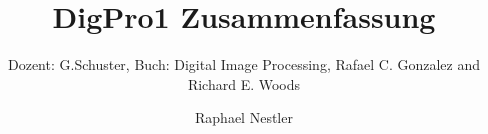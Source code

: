 \documentclass{scrartcl}
\title{DigPro1 Zusammenfassung}
\subtitle{Dozent: G.Schuster, Buch: Digital Image Processing, Rafael C. Gonzalez and Richard E. Woods}
\author{Raphael Nestler}
\begin{document}
\begin{titlepage}
	\maketitle
	\thispagestyle{empty}
\end{titlepage}
\newpage

\tableofcontents
\newpage
\twocolumn






\end{document}

